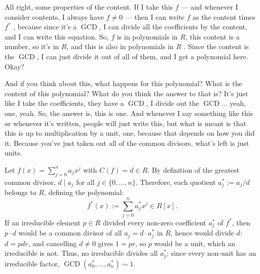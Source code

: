 \begin{speech}[00:04:53 - 00:06:10]
All right, some properties of the content. If I take this $f$ --- and whenever I consider contents, I always have $f \neq 0$ --- then I can write $f$ as the content times $f^*$ , because since it's a $\operatorname{GCD}$, I can divide all the coefficients by the content, and I can write this equation. So, $f$ is in polynomials in $R$, this content is a number, so it's in $R$, and this is also in polynomials in $R$ . Since the content is the $\operatorname{GCD}$, I can just divide it out of all of them, and I get a polynomial here. Okay?

And if you think about this, what happens for this polynomial? What is the content of this polynomial? What do you think the answer to that is? It's just like I take the coefficients, they have a $\operatorname{GCD}$, I divide out the $\operatorname{GCD}$... yeah, one, yeah.  So, the answer is, this is one. And whenever I say something like this or whenever it's written, people will just write this, but what is meant is that this is up to multiplication by a unit, one, because that depends on how you did it. Because you've just taken out all of the common divisors, what's left is just units.
\end{speech}

\begin{content}

\begin{steps}
Let $f(x) = \sum_{j=0}^n a_j x^j$ with $C(f) = d \in R$. By definition of the greatest common divisor, $d \mid a_j$ for all $j \in \{0, \dots, n\}$. Therefore, each quotient $a_j^* := a_j / d$ belongs to $R$, defining the polynomial:
\[
f^*(x) := \sum_{j=0}^n a_j^* x^j \in R[x].
\]
If an irreducible element $p \in R$ divided every non-zero coefficient $a_j^*$ of $f^*$, then $p \cdot d$ would be a common divisor of all $a_j = d \cdot a_j^*$ in $R$, hence would divide $d$: $d = p d r$, and cancelling $d \neq 0$ gives $1 = p r$, so $p$ would be a unit, which an irreducible is not. Thus, no irreducible divides all $a_j^*$; since every non-unit has an irreducible factor, $\operatorname{GCD}(a_0^*, \dots, a_n^*) \sim 1$.
\end{steps}
\end{content}

